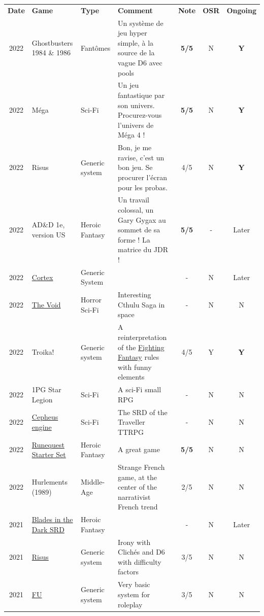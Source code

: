 \documentclass[a4paper, 11pt, twoside]{article}
\begin{document}
\begin{longtable}{cp{2cm}p{1.5cm}p{7cm}ccc}
\textbf{Date} & \textbf{Game} & \textbf{Type} & \textbf{Comment} & \textbf{Note} & \textbf{OSR} & \textbf{Ongoing}\\
2022 & Ghostbusters 1984 \& 1986 & Fantômes & Un système de jeu hyper simple, à la source de la vague D6 avec pools & \textbf{5/5} & N & \textbf{Y}\\
2022 & Méga & Sci-Fi & Un jeu fantastique par son univers. Procurez-vous l'univers de Méga 4 ! & \textbf{5/5} & N & \textbf{Y}\\
2022 & Risus & Generic system & Bon, je me ravise, c'est un bon jeu. Se procurer l'écran pour les probas. & 4/5 & N & \textbf{Y}\\
2022 & AD\&D 1e, version US & Heroic Fantasy & Un travail colossal, un Gary Gygax au sommet de sa forme ! La matrice du JDR ! & \textbf{5/5} & - & Later\\
2022 & \href{https://www.cortexrpg.com/compendium/explore-the-rules/}{Cortex} & Generic System &  & - & N & Later\\
2022 & \href{https://www.drivethrurpg.com/product/117563}{The Void} & Horror Sci-Fi & Interesting Cthulu Saga in space & - & N & N\\
2022 & Troika! & Generic system & A reinterpretation of the \href{https://github.com/orey/jdr/tree/master/FightingFantasys-fr}{Fighting Fantasy} rules with funny elements & 4/5 & Y & \textbf{Y}\\
2022 & 1PG Star Legion & Sci-Fi & A sci-Fi small RPG & - & N & N\\
2022 & \href{https://www.drivethrurpg.com/product/186894/Cepheus-Engine-System-Reference-Document}{Cepheus engine} & Sci-Fi & The SRD of the Traveller TTRPG & - & N & N\\
2022 & \href{https://www.chaosium.com/runequest-starter-set/}{Runequest Starter Set} & Heroic Fantasy & A great game & \textbf{5/5} & N & N\\
2022 & Hurlements (1989) & Middle-Age & Strange French game, at the center of the narrativist French trend & 2/5 & N & N\\
2021 & \href{https://github.com/orey/jdr/tree/master/BladesInTheDark-SRD}{Blades in the Dark SRD} & Heroic Fantasy &  & - & N & Later\\
2021 & \href{https://github.com/orey/jdr/tree/master/Risus-fr}{Risus} & Generic system & Irony with Clichés and D6 with difficulty factors & 3/5 & N & N\\
2021 & \href{https://www.drivethrurpg.com/product/89534/FU-The-Freeform-Universal-RPG-Classic-rules}{FU} & Generic system & Very basic system for roleplay & 3/5 & N & N\\

\end{longtable}
\end{document}
